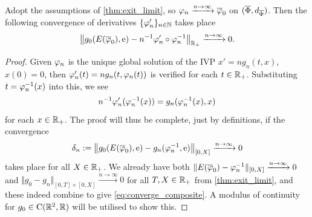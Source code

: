 \begin{lemma}\label{thm:para_deriv}
    Adopt the assumptions of \autoref{thm:exit_limit}, so $\varphi_n\xrightarrow{n\to\infty}\overline{\varphi}_0$ on $(\overline{\Phi},d_{\overline{\Phi}})$. Then the following convergence of derivatives $\{\varphi'_n\}_{n\in\mathbb{N}}$ takes place~
    \begin{equation}\label{eq:para_limit}
        \left\Vert g_0(E(\overline{\varphi}_0),\mathrm{e}) - n^{-1}\varphi'_n\circ\varphi_n^{-1}\right\Vert_{\mathbb{R}_+} \xrightarrow{n\to\infty}  0.
    \end{equation}
\end{lemma}
\begin{proof}
    Given $\varphi_n$ is the unique global solution of the IVP $x'=ng_n(t,x)$, $x(0)=0$, then $\varphi'_n(t)=ng_n(t,\varphi_n(t))$ is verified for each $t\in\mathbb{R}_+$. Substituting $t=\varphi^{-1}_n(x)$ into this, we see
    \begin{equation}
        n^{-1}\varphi_n'(\varphi_n^{-1}(x)) = g_n(\varphi^{-1}_n(x),x)
    \end{equation}
    for each $x\in\mathbb{R}_+$. The proof will thus be complete, just by definitions, if the convergence
    \begin{equation}\label{eq:converge_composite}
        \delta_n := \left\Vert g_0(E(\overline{\varphi}_0),\mathrm{e}) - g_n(\varphi^{-1}_n,\mathrm{e})\right\Vert_{[0,X]} \xrightarrow{n\to\infty}  0
    \end{equation}
    takes place for all $X\in\mathbb{R}_+$. We already have both $\Vert E(\overline{\varphi}_0)-\varphi^{-1}_n \Vert_{[0,X]}\xrightarrow{n\to\infty} 0$ and $\Vert g_0 - g_n \Vert_{[0,T]\times[0,X]}\xrightarrow{n\to\infty} 0$ for all $T,X\in\mathbb{R}_+$ from \autoref{thm:exit_limit}, and these indeed combine to give \autoref{eq:converge_composite}. A modulus of continuity for $g_0\in\mathrm{C}(\mathbb{R}^2,\mathbb{R})$ will be utilised to show this.


\end{proof}
